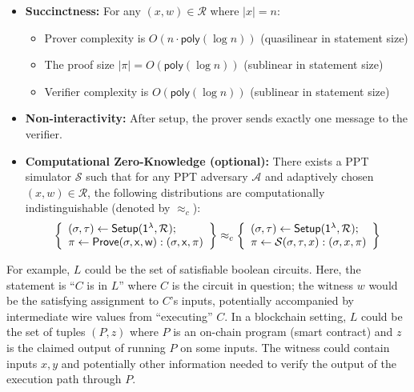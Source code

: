 \begin{definition}
\begin{itemize}
    \item \textbf{Succinctness:} For any $(x, w) \in \mathcal{R}$ where $|x| = n$:
    \begin{itemize}
        \item Prover complexity is $O(n \cdot \mathsf{poly}(\log n))$ (quasilinear in statement size)
        \item The proof size $|\pi| = O(\mathsf{poly}(\log n))$ (sublinear in statement size) 
        \item Verifier complexity is $O(\mathsf{poly}(\log n))$ (sublinear in statement size)
    \end{itemize}
    
    \item \textbf{Non-interactivity:} After setup, the prover sends exactly one message to the verifier.
    \item \textbf{Computational Zero-Knowledge (optional):} There exists a PPT simulator $\mathcal{S}$ such that for any PPT adversary $\mathcal{A}$ and adaptively chosen $(x, w) \in \mathcal{R}$, the following distributions are computationally indistinguishable (denoted by $\approx_c$):
    \begin{align*}
    \left\{ \begin{array}{l}
    (\sigma, \tau) \leftarrow \sf{Setup}(1^{\lambda}, \mathcal{R}); \\
    \pi \leftarrow \sf{Prove}(\sigma, x, w) : (\sigma, x, \pi)
    \end{array} \right\} \approx_c
    \left\{ \begin{array}{l}
    (\sigma, \tau) \leftarrow \sf{Setup}(1^{\lambda}, \mathcal{R}); \\
    \pi \leftarrow \mathcal{S}(\sigma, \tau, x) : (\sigma, x, \pi)
    \end{array} \right\}
\end{align*}
\end{itemize}
\end{definition}

\noindent For example, $L$ could be the set of satisfiable boolean circuits. Here, the statement is ``$C$ is in $L$'' where $C$ is the circuit in question; the witness $w$ would be the satisfying assignment to $C$'s inputs, potentially accompanied by intermediate wire values from ``executing'' $C$. In a blockchain setting, $L$ could be the set of tuples $(P, z)$ where $P$ is an on-chain program (smart contract) and $z$ is the claimed output of running $P$ on some inputs. The witness could contain inputs $x, y$ and potentially other information needed to verify the output of the execution path through $P$.\\

